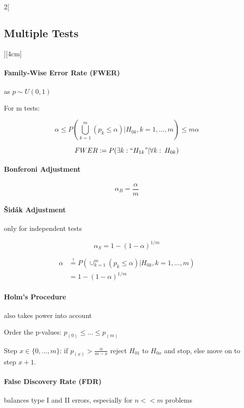 \documentclass[8pt]{extarticle}
\begin{document}
\begin{multicols}{2}[\subsection{Multiple Tests}][4cm]

\paragraph{Family-Wise Error Rate (FWER)} 
as $p \sim U(0,1)$

For m tests:

$$\alpha \leq P\left(\bigcup_{k=1}^m (p_k \leq \alpha)| H_{0k},k=1,...,m\right) \leq m\alpha$$

$$FWER := P(\exists k: ``H_{1k}"|\forall k:\: H_{0k})$$


\paragraph{Bonferoni Adjustment} 

$$\alpha_{B} = \frac{\alpha}{m}$$

\paragraph{\v{S}id\'{a}k Adjustment} only for independent tests

$$\alpha_{S} = 1- (1-\alpha)^{1/m}$$

\begin{Proof}
\vspace{-1.5em}
\begin{align*}
 \alpha &\overset{!}{=} P\left(\cup_{k=1}^m (p_k \leq \alpha)| H_{0k},k=1,...,m\right)\\
 &= 1- (1-\alpha)^{1/m}
\end{align*}
\end{Proof}

\paragraph{Holm's Procedure} also takes power into account

\noindent Order the p-values: $p_{(0)} \leq...\leq p_{(m)} $

\noindent Step $x \in \{0,...,m\}$: if $p_{(x)} > \frac{\alpha}{m - x}$ reject $H_{01}$ to $H_{0x}$ and stop, else move on to step $x+1$. 

\paragraph{False Discovery Rate (FDR)} balances type I and II errors, especially for $n<<m$ problems


\end{multicols}
\end{document}

